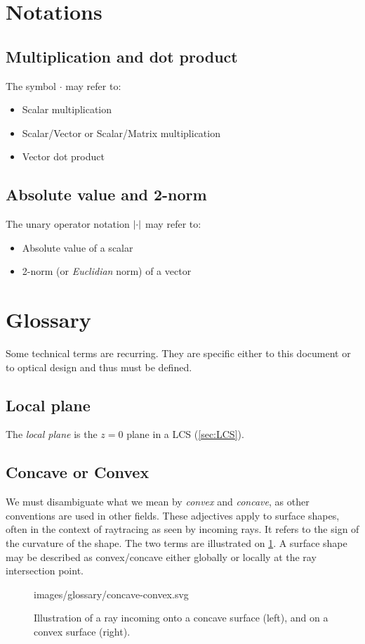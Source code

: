 \section{Notations}
\subsection{Multiplication and dot product}
The symbol $\cdot$ may refer to:
\begin{itemize}
\item Scalar multiplication
\item Scalar/Vector or Scalar/Matrix multiplication
\item Vector dot product
\end{itemize}

\subsection{Absolute value and 2-norm}
The unary operator notation $\abs{\cdot}$ may refer to:
\begin{itemize}
\item Absolute value of a scalar
\item 2-norm (or \emph{Euclidian} norm) of a vector
\end{itemize}

\section{Glossary}
Some technical terms are recurring. They are specific either to this document
or to optical design and thus must be defined.

\subsection{Local plane}
The \emph{local plane} is the $z=0$ plane in a \gls{LCS} (\cref{sec:LCS}).

\subsection{Concave or Convex}
We must disambiguate what we mean by \emph{convex} and \emph{concave}, as other
conventions are used in other fields. These adjectives apply to surface
shapes, often in the context of raytracing as seen by incoming rays.
It refers to the sign of the curvature of the shape.  The two terms are
illustrated on \cref{fig:concave-convex}. A surface shape may be described as
convex/concave either globally or locally at the ray intersection point.

\begin{figure} \caption{\label{fig:concave-convex} Illustration of a
ray incoming onto a concave surface (left), and on a convex surface (right).}

           {images/glossary/concave-convex.svg}
\end{figure}
